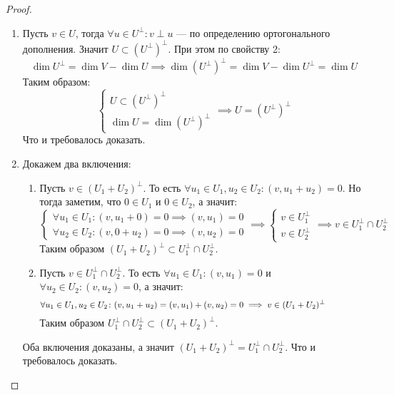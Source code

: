 \documentclass[../main.tex]{subfiles}
\begin{document}
\begin{proof}
\begin{enumerate}
    \item Пусть $v \in U$, тогда $\forall u \in U^\perp\colon v \perp u$ --- по определению ортогонального дополнения. Значит $ U \subset (U^\perp)^\perp $. При этом по свойству 2:
      \begin{equation*}
        \dim U^\perp = \dim V - \dim U
        \implies
        \dim (U^\perp)^\perp = \dim V - \dim U^\perp = \dim U
      \end{equation*}
    Таким образом:
    \begin{equation*}
      \begin{cases}
        U \subset (U^\perp)^\perp \\
        \dim U = \dim (U^\perp)^\perp
      \end{cases}
      \implies
      U = (U^\perp)^\perp
    \end{equation*}
    Что и требовалось доказать.

    \item Докажем два включения:
    \begin{enumerate}
      \item Пусть $v \in (U_1 + U_2)^\perp$. То есть $\forall u_1 \in U_1, u_2 \in U_2\colon (v, u_1 + u_2) = 0$. Но тогда заметим, что $0 \in U_1$ и $0 \in U_2$, а значит:
      \begin{equation*}
        \begin{cases}
          \forall u_1 \in U_1\colon (v, u_1 + 0) = 0 \implies (v, u_1) = 0 \\
          \forall u_2 \in U_2\colon (v, 0 + u_2) = 0 \implies (v, u_2) = 0
        \end{cases}
        \implies
        \begin{cases}
          v \in U_1^\perp \\
          v \in U_2^\perp
        \end{cases}
        \implies
        v \in U_1^\perp \cap U_2^\perp
      \end{equation*}
      Таким образом $(U_1 + U_2)^\perp \subset U_1^\perp \cap U_2^\perp$.

      \item Пусть $v \in U_1^\perp \cap U_2^\perp$. То есть $\forall u_1 \in U_1\colon (v, u_1) = 0$ и $\forall u_2 \in U_2\colon (v, u_2) = 0$, а значит:
      \begin{equation*}
        \forall u_1 \in U_1, u_2 \in U_2\colon
        (v, u_1 + u_2) = (v, u_1) + (v, u_2) = 0
        \implies
        v \in (U_1 + U_2)^\perp
        \hphantom{\forall u_1 \in U_1, u_2 \in U_2\colon}
      \end{equation*}
      Таким образом $U_1^\perp \cap U_2^\perp \subset (U_1 + U_2)^\perp$.
    \end{enumerate}
    Оба включения доказаны, а значит $(U_1 + U_2)^\perp = U_1^\perp \cap U_2^\perp$. Что и требовалось доказать.


\end{enumerate}
\end{proof}
\end{document}
